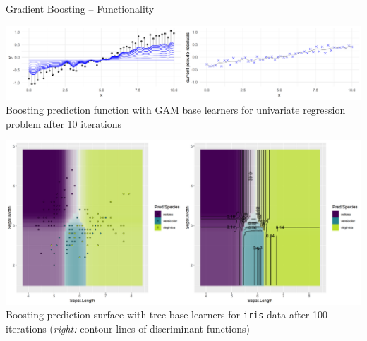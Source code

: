 \begin{frame}{Gradient Boosting -- Functionality}
\begin{minipage}{0.45\textwidth}
  \centering
  \includegraphics[width=\textwidth, trim=0 0 450 0, clip]{
  ../slides/boosting/figure/illustration_gaussian_huber_2_10} \\
  \tiny{Boosting prediction function with GAM base learners for univariate 
  regression problem after 10 iterations}
\end{minipage}%
\hfill
\begin{minipage}{0.45\textwidth}
  \centering
  \includegraphics[width=\textwidth]{
  ../slides/boosting/figure/boosting_multiclass_100} \\
  \tiny{Boosting prediction surface with tree base learners for \texttt{iris} 
  data after 100 iterations (\textit{right:} contour lines of discriminant 
  functions)}
\end{minipage}

\end{frame}



